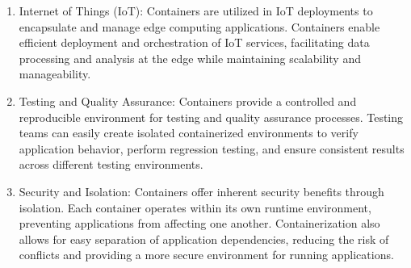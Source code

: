 \begin{enumerate}
    \item Internet of Things (IoT): Containers are utilized in IoT deployments to encapsulate and manage edge computing applications. Containers enable efficient deployment and orchestration of IoT services, facilitating data processing and analysis at the edge while maintaining scalability and manageability.

    \item Testing and Quality Assurance: Containers provide a controlled and reproducible environment for testing and quality assurance processes. Testing teams can easily create isolated containerized environments to verify application behavior, perform regression testing, and ensure consistent results across different testing environments.

    \item Security and Isolation: Containers offer inherent security benefits through isolation. Each container operates within its own runtime environment, preventing applications from affecting one another. Containerization also allows for easy separation of application dependencies, reducing the risk of conflicts and providing a more secure environment for running applications.
\end{enumerate}

